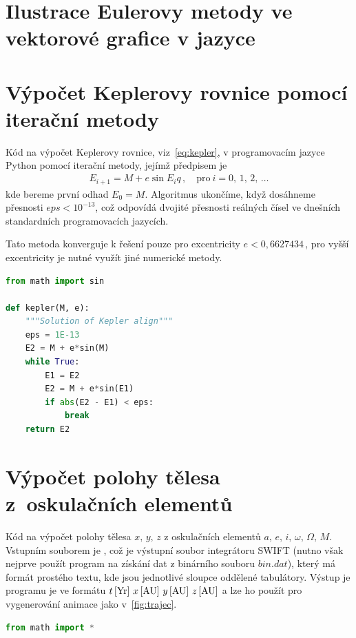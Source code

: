 \documentclass[A4paper, 12pt, oneside]{book}
\begin{document}
\printbibliography
\begin{appendices}
	\chapter{Ilustrace Eulerovy metody ve vektorové grafice v jazyce } \label{app:asy}

	\begin{figure}[!htb]
	\centering
	\end{figure}

	

	\chapter{Výpočet Keplerovy rovnice pomocí iterační metody} \label{app:kepit}
	Kód na výpočet Keplerovy rovnice, viz~\eqref{eq:kepler}, v programovacím jazyce Python pomocí iterační metody, jejímž předpisem je
	\begin{align*}
		E_{i+1}=M+e\sin{E_i}q\,, \quad \text{pro}\ i=0,\,1,\,2,\,\ldots
	\end{align*}
	kde bereme první odhad $E_0=M$. Algoritmus ukončíme, když dosáhneme přesnosti ${eps<10^{-13}}$, což odpovídá dvojité přesnosti reálných čísel ve dnešních standardních programovacích jazycích.

	Tato metoda konverguje k řešení pouze pro excentricity $e<0,6627434\,$, pro vyšší excentricity je nutné využít jiné numerické metody.
\begin{lstlisting}[language=Python]
from math import sin

def kepler(M, e):
    """Solution of Kepler align"""
    eps = 1E-13
    E2 = M + e*sin(M)
    while True:
        E1 = E2
        E2 = M + e*sin(E1)
        if abs(E2 - E1) < eps:
            break 
    return E2
\end{lstlisting}
	\chapter{Výpočet polohy tělesa z~oskulačních elementů} \label{app:el2xyz}
	Kód na výpočet polohy tělesa $x,\,y,\,z$ z oskulačních elementů $a,\,e,\,i,\,\omega,\,\Omega,\,M$. Vstupním souborem je , což je výstupní soubor integrátoru SWIFT (nutno však nejprve použít program  na získání dat z binárního souboru $bin.dat$), který má formát prostého textu, kde jsou jednotlivé sloupce oddělené tabulátory. Výstup je programu je ve formátu $t\,[{\rm Yr}]\ x\,[{\rm AU}]\ y\,[{\rm AU}]\ z\,[{\rm AU}]$ a lze ho použít pro vygenerování animace jako v~\ref{fig:trajec}.
	\begin{lstlisting}[language=Python]
from math import *


\end{lstlisting}
\end{appendices}
\end{document}
